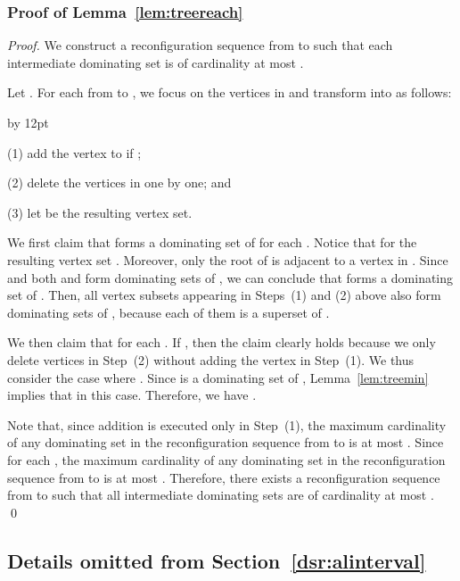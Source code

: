 \documentclass{llncs}
\newenvironment{listing}[1]{\begin{list}{*}{\settowidth{\labelwidth}{#1}\setlength{\leftmargin}{\labelwidth}\advance \leftmargin by 12pt
\setlength{\itemsep}{0pt}\setlength{\parsep}{0pt}\setlength{\topsep}{0pt}\setlength{\parskip}{0pt}}}{\end{list}}
\begin{document}
\subsubsection{Proof of Lemma~\ref{lem:treereach}}
\begin{proof}
We construct a reconfiguration sequence from  to 
such that each intermediate dominating set is of cardinality at most .
	
Let .
For each  from  to , we focus on the vertices in 
and transform  into  as follows:

\begin{listing}{aaa}
	\item[(1)] add the vertex  to  if ;
	\item[(2)] delete the vertices in  one by one; and
	\item[(3)] let  be the resulting vertex set.
\end{listing}
\smallskip
	
We first claim that  forms a dominating set of  for each .
Notice that  for the resulting
vertex set . Moreover, only the root  of  is adjacent to a vertex in .
Since  and both  and  form
dominating sets of , we can conclude that  forms a dominating set of .
Then, all vertex subsets appearing in Steps~(1) and (2) above also form
dominating sets of , because each of them is a superset of .

We then claim that  for each .
If , then the claim clearly holds because
we only delete vertices in Step~(2) without adding the vertex  in Step~(1).
We thus consider the case where .
Since  is a dominating set of , Lemma~\ref{lem:treemin} implies
that  in this case.
Therefore, we have .

Note that, since addition is executed only in Step~(1), the maximum cardinality of any dominating set
in the reconfiguration sequence from  to  is at most .
Since  for each , the maximum cardinality
of any dominating set in the reconfiguration sequence
from   to   is at most .
Therefore, there exists a reconfiguration sequence from  to  such that all
intermediate dominating sets are of cardinality at most .
\qed
\end{proof}

\subsection{Details omitted from Section~\ref{dsr:alinterval}}
\end{document}
